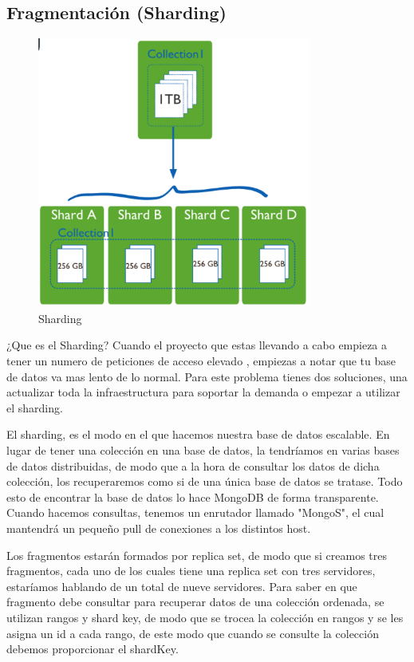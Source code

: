 \subsection{Fragmentación (Sharding)}
\begin{figure}[H]
    \centering
    \includegraphics[width=90mm]{memoria/LaTeX/img/infraestructura/shard.png}
    \caption{Sharding}
\end{figure}
¿Que es el Sharding? Cuando el proyecto que estas llevando a cabo empieza a tener un numero de peticiones de acceso elevado , empiezas a notar que tu base de datos va mas lento de lo normal. Para este problema tienes dos soluciones, una actualizar toda la infraestructura para soportar la demanda o empezar a utilizar el sharding.

El sharding, es el modo en el que hacemos nuestra base de datos escalable. En lugar de tener una colección en una base de datos, la tendríamos en varias bases de datos distribuidas, de modo que a la hora de consultar los datos de dicha colección, los recuperaremos como si de una única base de datos se tratase. Todo esto de encontrar la base de datos lo hace MongoDB de forma transparente. Cuando hacemos consultas, tenemos un enrutador llamado "MongoS", el cual mantendrá un pequeño pull de conexiones a los distintos host.

Los fragmentos estarán formados por replica set, de modo que
si creamos tres fragmentos, cada uno de los cuales tiene una
replica set con tres servidores, estaríamos hablando de un
total de nueve servidores. Para saber en que fragmento debe
consultar para recuperar datos de una colección ordenada, se
utilizan rangos y shard key, de modo que se trocea la colección en rangos y se les asigna un id a cada rango, de este modo que cuando se consulte la colección debemos proporcionar el shardKey.


